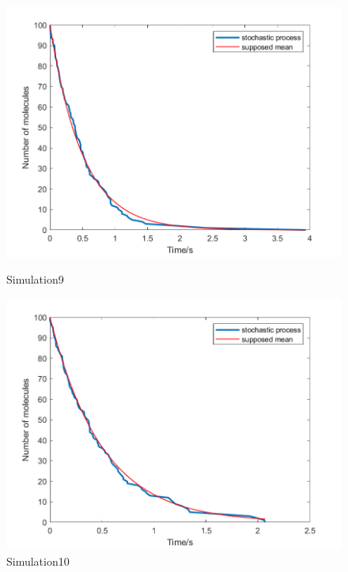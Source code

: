 \documentclass{article}
\begin{document}
\begin{figure}[htbp]
    \centering
    \begin{minipage}{0.45\linewidth}
        \centering
        \includegraphics[width=\linewidth]{graph/b9.png}
        \caption{Simulation9}
        \label{b9}
    \end{minipage}
    \hfill
    \begin{minipage}{0.45\linewidth}
        \centering
        \includegraphics[width=\linewidth]{graph/b10.png}
        \caption{Simulation10}
        \label{b10}
    \end{minipage}
\end{figure}
\end{document}
